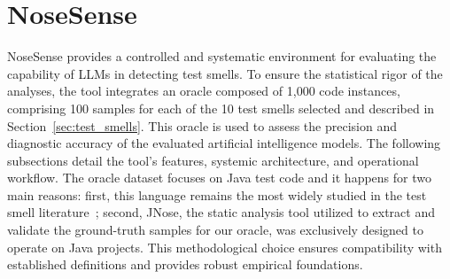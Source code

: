 \documentclass[sigconf]{acmart}
\begin{document}
\section{NoseSense}
\label{sec:nosesense}

NoseSense provides a controlled and systematic environment for evaluating the capability of LLMs in detecting test smells. To ensure the statistical rigor of the analyses, the tool integrates an oracle composed of 1,000 code instances, comprising 100 samples for each of the 10 test smells selected and described in Section~\ref{sec:test_smells}. This oracle is used to assess the precision and diagnostic accuracy of the evaluated artificial intelligence models. The following subsections detail the tool's features, systemic architecture, and operational workflow. The oracle dataset focuses on Java test code and it happens for two main reasons: first, this language remains the most widely studied in the test smell literature~\cite{Deursen01, Virginio2019, virginio2020jnose, peruma2019distribution}; second, JNose, the static analysis tool utilized to extract and validate the ground-truth samples for our oracle, was exclusively designed to operate on Java projects. This methodological choice ensures compatibility with established definitions and provides robust empirical foundations.
\end{document}
